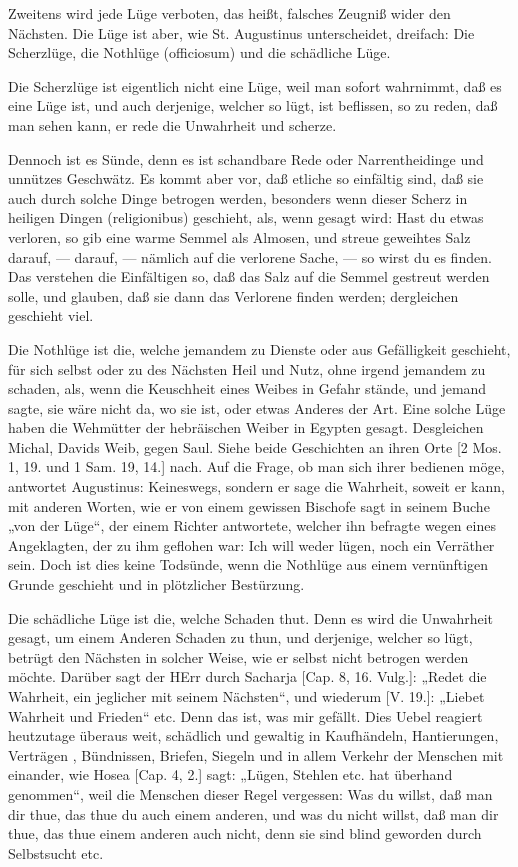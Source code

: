 Zweitens wird jede Lüge verboten, das heißt, falsches Zeugniß wider den Nächsten. Die Lüge ist aber, wie St. Augustinus unterscheidet, dreifach: Die Scherzlüge, die Nothlüge (officiosum) und die schädliche Lüge.

Die Scherzlüge ist eigentlich nicht eine Lüge, weil man sofort wahrnimmt, daß es eine Lüge ist, und auch derjenige, welcher so lügt, ist beflissen, so zu reden, daß man sehen kann, er rede die Unwahrheit und scherze.

Dennoch ist es Sünde, denn es ist schandbare Rede oder Narrentheidinge und unnützes Geschwätz. Es kommt aber vor, daß etliche so einfältig sind, daß sie auch durch solche Dinge betrogen werden, besonders wenn dieser Scherz in heiligen Dingen (religionibus) geschieht, als, wenn gesagt wird: Hast du etwas verloren, so gib eine warme Semmel als Almosen, und streue geweihtes Salz darauf, — darauf, — nämlich auf die verlorene Sache, — so wirst du es finden. Das verstehen die Einfältigen so, daß das Salz auf die Semmel gestreut werden solle, und glauben, daß sie dann das Verlorene finden werden; dergleichen geschieht viel.

Die Nothlüge ist die, welche jemandem zu Dienste oder aus Gefälligkeit geschieht, für sich selbst oder zu des Nächsten Heil und Nutz, ohne irgend jemandem zu schaden, als, wenn die Keuschheit eines Weibes in Gefahr stände, und jemand sagte, sie wäre nicht da, wo sie ist, oder etwas Anderes der Art. Eine solche Lüge haben die Wehmütter der hebräischen Weiber in Egypten gesagt. Desgleichen Michal, Davids Weib, gegen Saul. Siehe beide Geschichten an ihren Orte [2 Mos. 1, 19. und 1 Sam. 19, 14.] nach. Auf die Frage, ob man sich ihrer bedienen möge, antwortet Augustinus: Keineswegs, sondern er sage die Wahrheit, soweit er kann, mit anderen Worten, wie er von einem gewissen Bischofe sagt in seinem Buche „von der Lüge“, der einem Richter antwortete, welcher ihn befragte wegen eines Angeklagten, der zu ihm geflohen war: Ich will weder lügen, noch ein Verräther sein. Doch ist dies keine Todsünde, wenn die Nothlüge aus einem vernünftigen Grunde geschieht und in plötzlicher Bestürzung.

Die schädliche Lüge ist die, welche Schaden thut. Denn es wird die Unwahrheit gesagt, um einem Anderen Schaden zu thun, und derjenige, welcher so lügt, betrügt den Nächsten in solcher Weise, wie er selbst nicht betrogen werden möchte. Darüber sagt der HErr durch Sacharja [Cap. 8, 16. Vulg.]: „Redet die Wahrheit, ein jeglicher mit seinem Nächsten“, und wiederum [V. 19.]: „Liebet Wahrheit und Frieden“ etc. Denn das ist, was mir gefällt. Dies Uebel reagiert heutzutage überaus weit, schädlich und gewaltig in Kaufhändeln, Hantierungen, Verträgen
, Bündnissen, Briefen, Siegeln und in allem Verkehr der Menschen mit einander, wie Hosea [Cap. 4, 2.] sagt: „Lügen, Stehlen etc. hat überhand genommen“, weil die Menschen dieser Regel vergessen: Was du willst, daß man dir thue, das thue du auch einem anderen, und was du nicht willst, daß man dir thue, das thue einem anderen auch nicht, denn sie sind blind geworden durch Selbstsucht etc.

